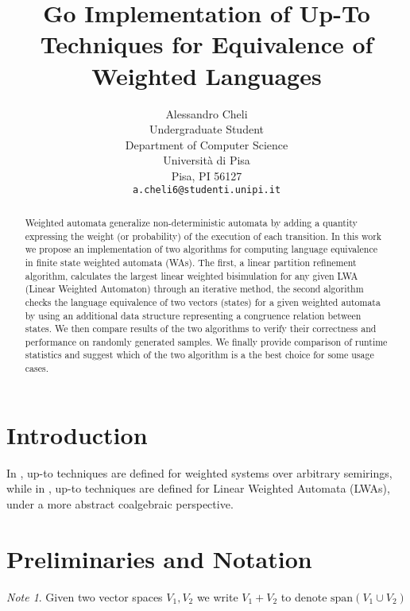 \documentclass{article}
\title{Go Implementation of Up-To Techniques for Equivalence of Weighted Languages}
\author{
  Alessandro Cheli \\
  Undergraduate Student \\
  Department of Computer Science \\
  Università di Pisa\\
  Pisa, PI 56127 \\
  \texttt{a.cheli6@studenti.unipi.it} \\
}
\theoremstyle{plain}%
\theoremstyle{definition}
\theoremstyle{remark}
\newtheorem*{note}{Note}
\newcommand{\mspan}[1]{\text{span}\left(#1\right)}
\begin{document}
\maketitle

\begin{abstract}
Weighted automata generalize non-deterministic automata by adding
a quantity expressing the weight (or probability) of the execution of each transition.
In this work we propose an implementation of two algorithms for computing language 
equivalence in finite state weighted automata (WAs). The first, a
linear partition refinement algorithm, calculates the largest linear weighted bisimulation
for any given LWA (Linear Weighted Automaton) through an iterative method, 
the second algorithm checks the language equivalence 
of two vectors (states) for a given weighted automata by using an additional
data structure representing a congruence relation between states.
We then compare results of the two algorithms to verify their correctness
and performance on randomly generated samples. 
We finally provide comparison of runtime statistics and suggest 
which of the two algorithm is a the best choice for some usage cases.
\end{abstract}




\section{Introduction}
\label{sec:intro}

In \cite{DBLP:journals/corr/Bonchi0K17}, up-to techniques are defined for
weighted systems over arbitrary semirings, while in \cite{BONCHI201277}, up-to techniques
are defined for Linear Weighted Automata (LWAs), under a more abstract coalgebraic perspective.

\section{Preliminaries and Notation}
\label{sec:notation}

\begin{note}
  Given two vector spaces $V_1, V_2$ we write $V_1 + V_2$ to denote $\mspan{V_1 \cup V_2}$
\end{note}
\end{document}
